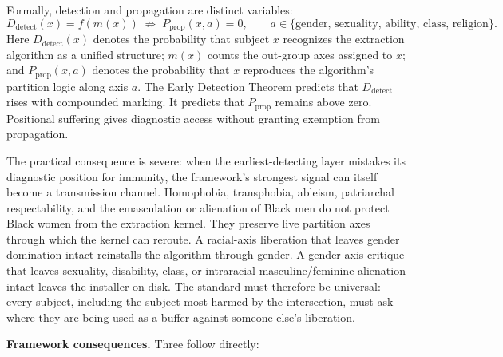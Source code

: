 Formally, detection and propagation are distinct variables:
\begin{equation}\label{eq:5.2-detection-not-immunity}
D_{\text{detect}}(x) = f(m(x)) \;\not\Rightarrow\; P_{\text{prop}}(x,a)=0,
\qquad
a \in \{\text{gender, sexuality, ability, class, religion}\}.
\end{equation}
Here $D_{\text{detect}}(x)$ denotes the probability that subject $x$ recognizes the extraction algorithm as a unified structure; $m(x)$ counts the out-group axes assigned to $x$; and $P_{\text{prop}}(x,a)$ denotes the probability that $x$ reproduces the algorithm's partition logic along axis $a$. The Early Detection Theorem predicts that $D_{\text{detect}}$ rises with compounded marking. It predicts that $P_{\text{prop}}$ remains above zero. Positional suffering gives diagnostic access without granting exemption from propagation.

The practical consequence is severe: when the earliest-detecting layer mistakes its diagnostic position for immunity, the framework's strongest signal can itself become a transmission channel. Homophobia, transphobia, ableism, patriarchal respectability, and the emasculation or alienation of Black men do not protect Black women from the extraction kernel. They preserve live partition axes through which the kernel can reroute. A racial-axis liberation that leaves gender domination intact reinstalls the algorithm through gender. A gender-axis critique that leaves sexuality, disability, class, or intraracial masculine/feminine alienation intact leaves the installer on disk. The standard must therefore be universal: every subject, including the subject most harmed by the intersection, must ask where they are being used as a buffer against someone else's liberation.

\noindent\textbf{Framework consequences.} Three follow directly:

